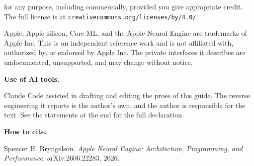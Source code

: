 {{   for any purpose, including commercially, provided you give appropriate credit.
   The full license is at \texttt{creativecommons.org/licenses/by/4.0/}.\par
   \vspace{8pt}
   \noindent Apple, Apple silicon, Core ML, and the Apple Neural Engine are
   trademarks of Apple Inc. This is an independent reference work and is not
   affiliated with, authorized by, or endorsed by Apple Inc. The private
   interfaces it describes are undocumented, unsupported, and may change without
   notice.\par
   \vspace{10pt}
   \noindent\textbf{Use of AI tools.}\par
   \noindent Claude Code assisted in drafting and editing the prose of this guide.
   The reverse engineering it reports is the author's own, and the author is
   responsible for the text. See the statements at the end for the full
   declaration.\par
   \vspace{10pt}
   \noindent\textbf{How to cite.}\par
   \noindent Spencer H. Bryngelson. \textit{Apple Neural Engine: Architecture,
   Programming, and Performance.} arXiv:2606.22283, 2026.\par
   \vspace{16pt}}
  \clearpage{}}

\makeatletter
\newcommand{\anepartopen}[2]{%
  \clearpage\thispagestyle{empty}%
  \def\ANE@eb{#1}%
  \addcontentsline{toc}{part}{\ifx\ANE@eb\@empty #2\else #1. #2\fi}%
  \vspace*{0.20\textheight}%
  {\parindent\z@\raggedright
   \ifx\ANE@eb\@empty\else
     {\color{accent!75}\large\aneeyebrow{#1}}\par\vskip 9\p@
   \fi
   {\color{accent}\hrule height 2pt}\vskip 16\p@
   {\color{accent}\bfseries\fontsize{30}{34}\selectfont #2\par}%
   \vskip 13\p@{\color{rulegrey}\hrule height 1pt}\vskip 24\p@}%
  \begingroup\parindent\z@\raggedright}
\newcommand{\anechap}[3]{%
  \noindent{\color{accent}\bfseries #1}\hspace{1.1em}{\color{black!85}#2}\par
  \def\ANE@cb{#3}\ifx\ANE@cb\@empty\else
    \nobreak\noindent\hspace*{2.7em}{\color{black!55}\small #3}\par
  \fi
  \vskip 9\p@}
\newcommand{\anepartclose}{\endgroup\clearpage}
\makeatother
